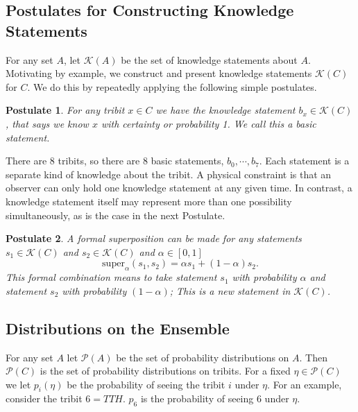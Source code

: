 \documentclass[12pt,a4paper]{article}
\theoremstyle{myrule}
\theoremstyle{postulate}
\newtheorem{postulate}{Postulate}[section]
\theoremstyle{definition}
\begin{document}
\subsection{Postulates for Constructing Knowledge Statements}
For any set $A$, let $\mathcal{K}(A)$ be the set of knowledge statements about $A$.  Motivating by example, we construct and present knowledge statements $\mathcal{K}(C)$ for $C$.  We do this by repeatedly applying the following simple postulates.
\begin{postulate}
\label{rule1}
For any tribit $x \in C$ we have the knowledge statement $b_x \in \mathcal{K}(C)$, that says we know $x$ with certainty or probability 1.  We call this a basic statement.
\end{postulate}
There are 8 tribits, so there are 8 basic statements, $b_\mathit{0},\cdots,b_\mathit{7}$.  Each statement is a separate kind of knowledge about the tribit.  A physical constraint is that an observer can only hold one knowledge statement at any given time.  In contrast, a knowledge statement itself may represent more than one possibility simultaneously, as is the case in the next Postulate.
\begin{postulate}
 \label{rule2}
  A formal superposition can be made for any statements $s_1 \in \mathcal{K}(C)$ and $s_2 \in \mathcal{K}(C)$ and $\alpha \in [0,1]$
  \begin{equation}
  \label{super}
  \text{super}_\alpha(s_1,s_2) = \alpha s_1 + (1 -\alpha) s_2.
  \end{equation}
This formal combination means to take statement $s_1$ with probability $\alpha$ and statement $s_2$ with probability $(1-\alpha)$; This is a new statement in $ \mathcal{K}(C)$.
\end{postulate}

\subsection{Distributions on the Ensemble}

For any set $A$ let $\mathcal{P}(A)$ be the set of probability distributions on $A$.  Then $\mathcal{P}(C)$ is the set of probability distributions on tribits. For a fixed $\eta \in \mathcal{P}(C)$ we let $p_i(\eta)$ be the probability of seeing the tribit $i$ under $\eta$.  For an example, consider the tribit $\mathit{6} = TTH$.  $p_\mathit{6}$ is the probability of seeing $\mathit{6}$ under $\eta$.
\end{document}
